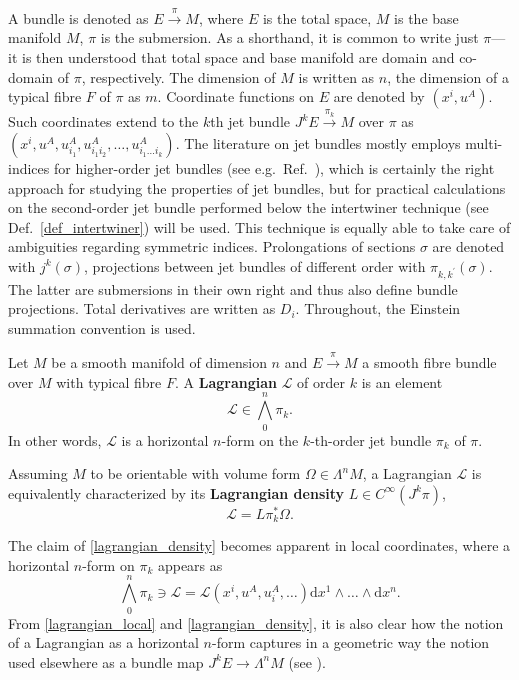 A bundle is denoted as $E\overset{\pi}{\longrightarrow}M$, where $E$ is the total space, $M$ is the base manifold $M$, $\pi$ is the submersion. As a shorthand, it is common to write just $\pi$---it is then understood that total space and base manifold are domain and co-domain of $\pi$, respectively. The dimension of $M$ is written as $n$, the dimension of a typical fibre $F$ of $\pi$ as $m$. Coordinate functions on $E$ are denoted by $(x^i,u^A)$. Such coordinates extend to the $k$th jet bundle $J^kE \overset{\pi_k}{\longrightarrow}M$ over $\pi$ as $(x^i,\allowbreak u^A,\allowbreak u^A_{i_1},\allowbreak u^A_{i_1i_2},\allowbreak \dots,\allowbreak u^A_{i_1\dots i_k})$. The literature on jet bundles mostly employs multi-indices for higher-order jet bundles (see e.g.\ Ref.\ \cite{Saunders_1989}), which is certainly the right approach for studying the properties of jet bundles, but for practical calculations on the second-order jet bundle performed below the intertwiner technique (see Def.\ \ref{def_intertwiner}) will be used. This technique is equally able to take care of ambiguities regarding symmetric indices. Prolongations of sections $\sigma$ are denoted with $j^k(\sigma)$, projections between jet bundles of different order with $\pi_{k,k^\prime}(\sigma)$. The latter are submersions in their own right and thus also define bundle projections. Total derivatives are written as $D_i$. Throughout, the Einstein summation convention is used.

\begin{definition}
  Let $M$ be a smooth manifold of dimension $n$ and $E \overset{\pi}{\longrightarrow} M$ a smooth fibre bundle over $M$ with typical fibre $F$. A \textbf{Lagrangian} $\mathscr L$ of order $k$ is an element
  \begin{equation}
    \mathscr L \in \textstyle\bigwedge^n_0\pi_k.
  \end{equation}
In other words, $\mathscr L$ is a horizontal $n$-form on the $k$-th-order jet bundle $\pi_k$ of $\pi$.

Assuming $M$ to be orientable with volume form $\Omega\in\Lambda^nM$, a Lagrangian $\mathscr L$ is equivalently characterized by its \textbf{Lagrangian density} $L\in C^\infty(J^k\pi)$,
  \begin{equation}\label{lagrangian_density}
  \mathscr L = L\pi_k^\ast\Omega.
\end{equation}
\end{definition}

The claim of \eqref{lagrangian_density} becomes apparent in local coordinates, where a horizontal $n$-form on $\pi_k$ appears as
\begin{equation}\label{lagrangian_local}
  \textstyle\bigwedge^n_0\pi_k\ni \mathscr L = \mathscr L(x^i,u^A,u^A_i,\dots) \mathrm dx^1\wedge \dots \wedge \mathrm dx^n.
\end{equation}
From \eqref{lagrangian_local} and \eqref{lagrangian_density}, it is also clear how the notion of a Lagrangian as a horizontal $n$-form captures in a geometric way the notion used elsewhere as a bundle map $J^kE \rightarrow \Lambda^nM$ (see \cite{Saunders_1989,Gotay_1992,Alex_2020}).


